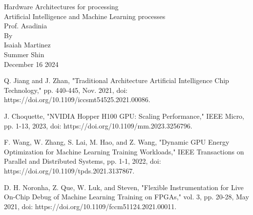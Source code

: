 \documentclass[a4paper,12pt]{article}
\begin{document}
    \begin{titlepage}
        \centering
        \Large
        Hardware Architectures for processing\\
        Artificial Intelligence and Machine Learning processes\\
        [1.5in]
        
        Prof. Asadinia\\
        [1.5in]
        
        By\\
        Isaiah Martinez\\
        Summer Shin\\

        \vspace{\fill}
        December 16 2024\\
    \end{titlepage}

    
    
    
     
    

    \begin{thebibliography}{}

         Q. Jiang and J. Zhan, "Traditional Architecture Artificial Intelligence Chip Technology," pp. 440-445, Nov. 2021, doi: https://doi.org/10.1109/iccsmt54525.2021.00086.

         J. Choquette, "NVIDIA Hopper H100 GPU: Scaling Performance," IEEE Micro, pp. 1-13, 2023, doi: https://doi.org/10.1109/mm.2023.3256796.

         F. Wang, W. Zhang, S. Lai, M. Hao, and Z. Wang, "Dynamic GPU Energy Optimization for Machine Learning Training Workloads," IEEE Transactions on Parallel and Distributed Systems, pp. 1-1, 2022, doi: https://doi.org/10.1109/tpds.2021.3137867. 

         D. H. Noronha, Z. Que, W. Luk, and Steven, "Flexible Instrumentation for Live On-Chip Debug of Machine Learning Training on FPGAs," vol. 3, pp. 20-28, May 2021, doi: https://doi.org/10.1109/fccm51124.2021.00011.

    \end{thebibliography}
\end{document}
